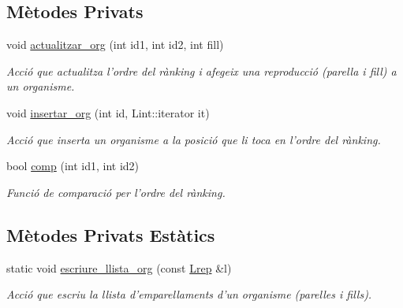 \subsection*{Mètodes Privats}
\begin{DoxyCompactItemize}
\item 
void \hyperlink{class_ranking_ae50ccf2d119cbea1516d364eec410e2c}{actualitzar\-\_\-org} (int id1, int id2, int fill)
\begin{DoxyCompactList}\small\item\em Acció que actualitza l'ordre del rànking i afegeix una reproducció (parella i fill) a un organisme. \end{DoxyCompactList}\item 
void \hyperlink{class_ranking_ae630f4cd186f1fdc8ac596e41c5114af}{insertar\-\_\-org} (int id, Lint\-::iterator it)
\begin{DoxyCompactList}\small\item\em Acció que inserta un organisme a la posició que li toca en l'ordre del rànking. \end{DoxyCompactList}\item 
bool \hyperlink{class_ranking_a66bcf7bd941f2b07e7197943fcc5fcb7}{comp} (int id1, int id2)
\begin{DoxyCompactList}\small\item\em Funció de comparació per l'ordre del rànking. \end{DoxyCompactList}\end{DoxyCompactItemize}
\subsection*{Mètodes Privats Estàtics}
\begin{DoxyCompactItemize}
\item 
static void \hyperlink{class_ranking_a6b0ff3c2276a8f6e3a24f8394329ccab}{escriure\-\_\-llista\-\_\-org} (const \hyperlink{class_ranking_a6cdd02db4b2c2187ae5d7294330b9189}{Lrep} \&l)
\begin{DoxyCompactList}\small\item\em Acció que escriu la llista d'emparellaments d'un organisme (parelles i fills). \end{DoxyCompactList}\end{DoxyCompactItemize}
